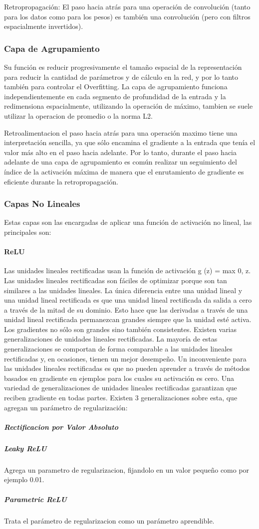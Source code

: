 \documentclass[a4paper,11pt,spanish]{book}
\begin{document}
	Retropropagación: El paso hacia atrás para una operación de convolución (tanto para los datos como para los pesos) es también una convolución (pero con filtros espacialmente invertidos).

      \subsubsection{Capa de Agrupamiento} 
	Su función es reducir progresivamente el tamaño espacial de la representación para reducir la cantidad de parámetros y de cálculo en la red, y por lo tanto también para controlar
	el Overfitting. La capa de agrupamiento funciona independientemente en cada segmento de profundidad de la entrada y la redimensiona espacialmente, utilizando la operación de máximo, 
	tambien se suele utilizar la operacion de promedio o la norma L2.

	Retroalimentacion
	el paso hacia atrás para una operación maximo tiene una interpretación sencilla, ya que sólo encamina el gradiente a la entrada que tenía el valor más alto en el paso hacia
	adelante. Por lo tanto, durante el paso hacia adelante de una capa de agrupamiento es común realizar un seguimiento del índice de la activación máxima de manera que 
	el enrutamiento de gradiente es eficiente durante la retropropagación.

      \subsubsection{Capas No Lineales}
	Estas capas son las encargadas de aplicar una función de activación no lineal, las principales son:
	\paragraph{ReLU} Las unidades lineales rectificadas usan la función de activación g (z) = max {0, z}. 
	Las unidades lineales rectificadas son fáciles de optimizar porque son tan similares a las unidades lineales. 
	La única diferencia entre una unidad lineal y una unidad lineal rectificada es que una unidad lineal rectificada da salida a cero a través de la mitad de su dominio. 
	Esto hace que las derivadas a través de una unidad lineal rectificada permanezcan grandes siempre que la unidad esté activa.
	Los gradientes no sólo son grandes sino también consistentes.
	Existen varias generalizaciones de unidades lineales rectificadas. La mayoría de estas generalizaciones se comportan de forma comparable a las unidades lineales rectificadas
	y, en ocasiones, tienen un mejor desempeño. Un inconveniente para las unidades lineales rectificadas es que no pueden aprender a través de métodos basados ​​en 
	gradiente en ejemplos para los cuales su activación es cero. Una variedad de generalizaciones de unidades lineales rectificadas garantizan que reciben gradiente en 
	todas partes. Existen 3 generalizaciones sobre esta, que agregan un parámetro de regularización:
	  \subparagraph{Rectificacion por Valor Absoluto}
	  \subparagraph{Leaky ReLU} Agrega un parametro de regularizacion, fijandolo en un valor pequeño como por ejemplo 0.01.
	  \subparagraph{Parametric ReLU} Trata el parámetro de regularizacion como un parámetro aprendible.
\end{document}
